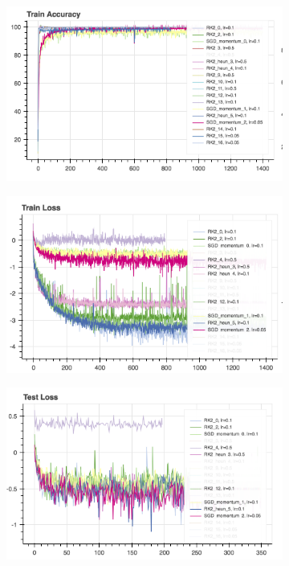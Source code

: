 \begin{figure}[htb]
\begin{subfigure}{0.5\textwidth}
\includegraphics[scale=0.45]{plots/res_cifar.png}
\end{subfigure}
\begin{subfigure}{0.5\textwidth}
\includegraphics[scale=0.45]{plots/res_cifar_2.png}
\end{subfigure}
\begin{subfigure}{0.5\textwidth}
\includegraphics[scale=0.45]{plots/res_cifar_3.png}

\end{subfigure}
\end{figure}
